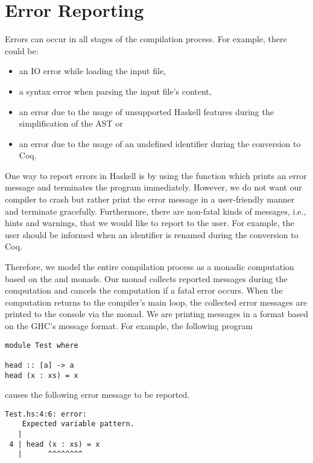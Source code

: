 \section{Error Reporting} \label{sec:implementation:error-reporting}
Errors can occur in all stages of the compilation process.
For example, there could be:
\begin{itemize}
  \item an IO error while loading the input file,
  \item a syntax error when parsing the input file's content,
  \item an error due to the usage of unsupported Haskell features during the simplification of the AST or
  \item an error due to the usage of an undefined identifier during the conversion to Coq.
\end{itemize}
One way to report errors in Haskell is by using the  function which prints an error message and terminates the program immediately.
However, we do not want our compiler to crash but rather print the error message in a user-friendly manner and terminate gracefully.
Furthermore, there are non-fatal kinds of messages, i.e., hints and warnings, that we would like to report to the user.
For example, the user should be informed when an identifier is renamed during the conversion to Coq.

Therefore, we model the entire compilation process as a monadic computation based on the  and  monads.
Our monad collects reported messages during the computation and cancels the computation if a fatal error occurs.
When the computation returns to the compiler's main loop, the collected error messages are printed to the console via the  monad.
We are printing messages in a format based on the GHC's message format.
For example, the following program
\begin{verbatim}
module Test where

head :: [a] -> a
head (x : xs) = x
\end{verbatim}
causes the following error message to be reported.
\begin{verbatim}
Test.hs:4:6: error:
    Expected variable pattern.
   |
 4 | head (x : xs) = x
   |      ^^^^^^^^
\end{verbatim}
